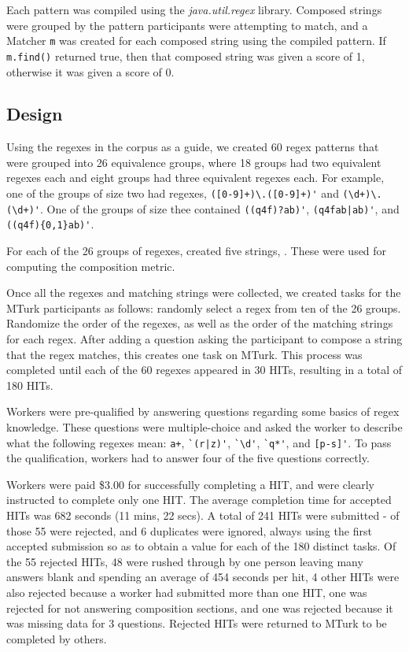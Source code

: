 Each pattern was compiled using the \emph{java.util.regex} library.
Composed strings were grouped by the pattern participants were attempting to match, and a Matcher \verb!m! was created for each composed string using the compiled pattern.  If \verb!m.find()! returned true, then that composed string was given a score of 1, otherwise it was given a score of 0.


\subsection{Design}
Using the regexes in the corpus as a guide, we created 60 regex patterns that were grouped into 26 equivalence groups, where 18 groups had two equivalent regexes each and eight groups had three equivalent regexes each. For example, one of the groups of size two had regexes, \verb!([0-9]+)\.([0-9]+)'! and \verb!(\d+)\.(\d+)'!. One of the groups of size thee contained \verb!((q4f)?ab)'!, \verb!(q4fab|ab)'!, and \verb!((q4f){0,1}ab)'!.

For each of the 26 groups of regexes, created five strings, . These were used for computing the composition metric.

Once all the regexes and matching strings were collected, we created tasks for the MTurk participants as follows: randomly select a regex from ten of the 26 groups. Randomize the order of the regexes, as well as the order of the matching strings for each regex. After adding a question asking the participant to compose a string that the regex matches, this creates one task on MTurk. This process was completed until each of the 60 regexes appeared in 30 HITs, resulting in a total of 180 HITs.

Workers were pre-qualified by answering questions regarding some basics of regex knowledge. These questions were multiple-choice and asked the worker to describe what the following regexes mean: \verb!a+!, \verb!`(r|z)'!, \verb!`\d'!, \verb!`q*'!, and \verb![p-s]'!. To pass the qualification, workers had to answer four of the five questions correctly.

Workers were paid \$3.00 for successfully completing a HIT, and were clearly instructed to complete only one HIT.  The average completion time for accepted HITs was 682 seconds (11 mins, 22 secs).  A total of 241 HITs were submitted - of those 55 were rejected, and 6 duplicates were ignored, always using the first accepted submission so as to obtain a value for each of the 180 distinct tasks.
Of the 55 rejected HITs, 48 were rushed through by one person leaving many answers blank and spending an average of 454 seconds per hit, 4 other HITs were also rejected because a worker had submitted more than one HIT, one was rejected for not answering composition sections, and one was rejected because it was missing data for 3 questions.  Rejected HITs were returned to MTurk to be completed by others.

